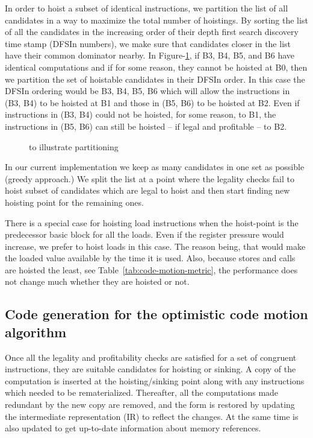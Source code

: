 \documentclass[acmlarge,review,anonymous]{acmart}\settopmatter{printfolios=true}
\begin{document}
In order to hoist a subset of identical instructions, we partition the list of
all candidates in a way to maximize the total number of hoistings.  By sorting
the list of all the candidates in the increasing order of their depth first
search discovery time stamp \cite{clrs} (DFSIn numbers), we make sure that
candidates closer in the list have their common dominator nearby. In
Figure-\ref{fig:dfsin}, if B3, B4, B5, and B6 have identical computations and if
for some reason, they cannot be hoisted at B0, then we partition the set of
hoistable candidates in their DFSIn order. In this case the DFSIn ordering would
be B3, B4, B5, B6 which will allow the instructions in (B3, B4) to be hoisted at
B1 and those in (B5, B6) to be hoisted at B2. Even if instructions in (B3, B4)
could not be hoisted, for some reason, to B1, the instructions in (B5, B6) can
still be hoisted -- if legal and profitable -- to B2.

\begin{figure}
\centering
\caption{\CFG{} to illustrate partitioning}
\label{fig:dfsin}
\end{figure}

In our current implementation we keep as many candidates in one set as possible
(greedy approach.) We split the list at a point where the legality checks fail
to hoist subset of candidates which are legal to hoist and then start finding
new hoisting point for the remaining ones.


There is a special case for hoisting load instructions when the hoist-point is
the predecessor basic block for all the loads. Even if the register pressure
would increase, we prefer to hoist loads in this case. The reason being, that
would make the loaded value available by the time it is used. Also, because
stores and calls are hoisted the least, see Table~\ref{tab:code-motion-metric},
the performance does not change much whether they are hoisted or not.

\subsection{Code generation for the optimistic code motion algorithm}
\label{subsec:optimistic}
Once all the legality and profitability checks are satisfied for a set of
congruent instructions, they are suitable candidates for hoisting or sinking. A
copy of the computation is inserted at the hoisting/sinking point along with any
instructions which needed to be rematerialized. Thereafter, all the computations
made redundant by the new copy are removed, and the \SSA{} form is restored by
updating the intermediate representation (IR) to reflect the changes. At the
same time \MemorySSA{} is also updated to get up-to-date information about
memory references.
\end{document}
